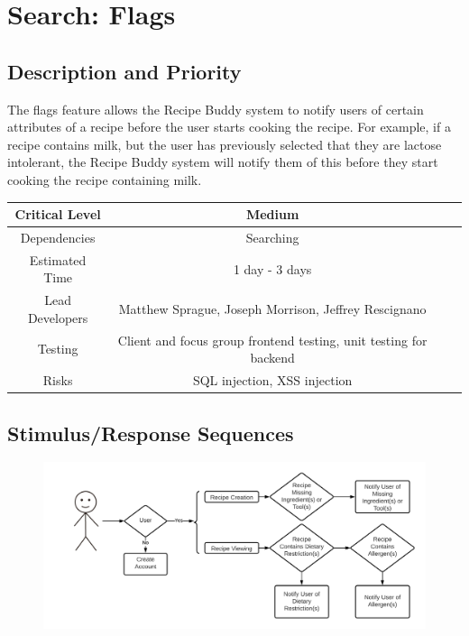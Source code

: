 \documentclass{scrreprt}
\begin{document}
\section{Search: Flags}

\subsection{Description and Priority}

The flags feature allows the \gls{Recipe Buddy} system to notify users of certain attributes of a recipe before the user starts cooking the recipe. For example, if a recipe contains milk, but the user has previously selected that they are lactose intolerant, the \gls{Recipe Buddy} system will notify them of this before they start cooking the recipe containing milk.

\begin{center}
    \begin{tabular}{| c | c | c | c |}
        \hline
        Critical Level  & Medium                                                            \\
        \hline
        Dependencies    & Searching                                                         \\
        \hline
        Estimated Time  & 1 day - 3 days                                                    \\
        \hline
        Lead Developers & Matthew Sprague, Joseph Morrison, Jeffrey Rescignano              \\
        \hline
        Testing         & Client and focus group frontend testing, unit testing for backend \\
        \hline
        Risks           & \gls{SQL injection}, \gls{XSS injection}                          \\
        \hline
    \end{tabular}
\end{center}

\subsection{Stimulus/Response Sequences}

\begin{figure}[H]\centering
    \includegraphics[width=\columnwidth]{FlowCharts/Search-Flags.png}
\end{figure}
\end{document}
